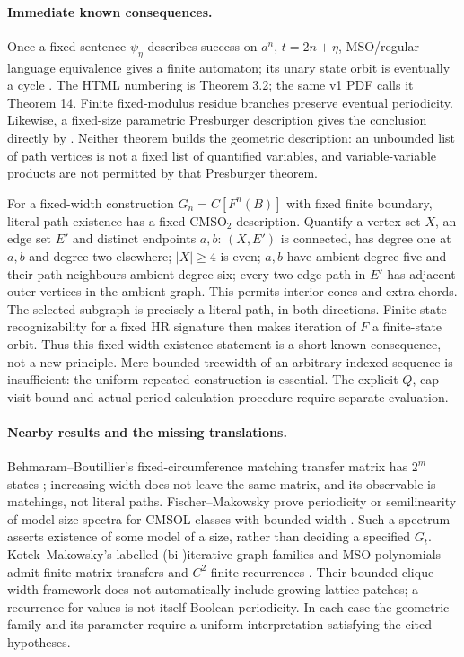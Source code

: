 \documentclass[11pt]{amsart}
\theoremstyle{definition}\newtheorem{definition}{Definition}
\begin{document}
\paragraph{Immediate known consequences.}
Once a fixed sentence $\psi_\eta$ describes success on $a^n$,
$t=2n+\eta$, MSO/regular-language equivalence gives a finite automaton;
its unary state orbit is eventually a cycle \cite[Section 3.1]{MSO}.
The HTML numbering is Theorem 3.2; the same v1 PDF calls it Theorem 14.
Finite fixed-modulus residue branches preserve eventual periodicity.
Likewise, a fixed-size parametric Presburger description gives the
conclusion directly by \cite[Theorem 1.15]{BGW}. Neither theorem builds
the geometric description: an unbounded list of path vertices is not
a fixed list of quantified variables, and variable-variable products
are not permitted by that Presburger theorem.

For a fixed-width construction $G_n=C[F^n(B)]$ with fixed finite
boundary, literal-path existence has a fixed CMSO$_2$ description.
Quantify a vertex set $X$, an edge set $E'$ and distinct endpoints
$a,b$: $(X,E')$ is connected, has degree one at $a,b$ and degree two
elsewhere; $|X|\ge4$ is even; $a,b$ have ambient degree five and their
path neighbours ambient degree six; every two-edge path in $E'$ has
adjacent outer vertices in the ambient graph. This permits interior
cones and extra chords. The selected subgraph is precisely a literal
path, in both directions. Finite-state recognizability for a fixed
HR signature \cite[Chapter 1, Theorems 1.12 and 1.21(2)]{Courcelle}
then makes iteration of $F$ a finite-state orbit. Thus this fixed-width
existence statement is a short known consequence, not a new principle.
Mere bounded treewidth of an arbitrary indexed sequence is insufficient:
the uniform repeated construction is essential. The explicit $Q$,
cap-visit bound and actual period-calculation procedure require
separate evaluation.

\paragraph{Nearby results and the missing translations.}
Behmaram--Boutillier's fixed-circumference matching transfer matrix
has $2^m$ states \cite[Section 3, Eq.\ (3.1)]{Behmaram}; increasing
width does not leave the same matrix, and its observable is matchings,
not literal paths. Fischer--Makowsky prove periodicity or semilinearity
of model-size spectra for CMSOL classes with bounded width
\cite[Theorems 1.4, 1.7 and 1.10]{Fischer}. Such a spectrum asserts
existence of some model of a size, rather than deciding a specified
$G_t$. Kotek--Makowsky's labelled (bi-)iterative graph families and MSO
polynomials admit finite matrix transfers and $C^2$-finite recurrences
\cite[Definitions 17--20, Lemma 28, Theorems 30 and 32]{Kotek}.
Their bounded-clique-width framework does not automatically include
growing lattice patches; a recurrence for values is not itself
Boolean periodicity. In each case the geometric family and its
parameter require a uniform interpretation satisfying the cited
hypotheses.
\end{document}
